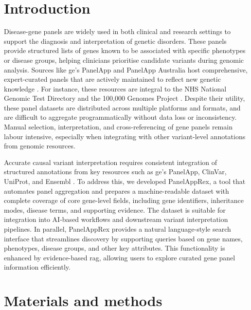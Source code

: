 \section{Introduction}
\noindent
Disease-gene panels are widely used in both clinical and research settings to support the diagnosis and interpretation of genetic disorders. 
These panels provide structured lists of genes known to be associated with specific phenotypes or disease groups, helping clinicians prioritise candidate variants during genomic analysis. 
Sources like \ac{ge}’s PanelApp and PanelApp Australia host comprehensive, expert-curated panels that are actively maintained to reflect new genetic knowledge \cite{martin_panelapp_2019}. 
For instance, these resources are integral to the NHS National Genomic Test Directory and the 100,000 Genomes Project \cite{martin_panelapp_2019}. 
Despite their utility, these panel datasets are distributed across multiple platforms and formats, and are difficult to aggregate programmatically without data loss or inconsistency. 
Manual selection, interpretation, and cross-referencing of gene panels remain labour intensive, especially when integrating with other variant-level annotations from genomic resources. 

Accurate causal variant interpretation requires consistent integration of structured annotations from key resources such as \ac{ge}’s PanelApp, ClinVar, UniProt, and Ensembl \cite{martin_panelapp_2019, landrum_clinvar_2018, the_uniprot_consortium_uniprot_2025, dyer_ensembl_2025}. 
To address this, we developed PanelAppRex, a tool that automates panel aggregation and prepares a machine-readable dataset with complete coverage of core gene-level fields, including gene identifiers, inheritance modes, disease terms, and supporting evidence. 
The dataset is suitable for integration into AI-based workflows and downstream variant interpretation pipelines. 
In parallel, PanelAppRex provides a natural language-style search interface that streamlines discovery by supporting queries based on gene names, phenotypes, disease groups, and other key attributes. 
This functionality is enhanced by evidence-based \ac{rag}, allowing users to explore curated gene panel information efficiently. 

\section{Materials and methods}

